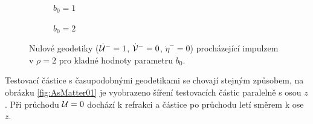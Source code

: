 \begin{figure}[ht]
    \centering
    \begin{subfigure}[b]{0.45\textwidth}
        \caption{$b_0 = 1$}
    \end{subfigure}
    \hfill
    \begin{subfigure}[b]{0.45\textwidth}
        \caption{$b_0 = 2$}
    \end{subfigure}
\caption{Nulové geodetiky ($\dot {\mathcal{U}}^-=1$, $\dot {\mathcal{V}}^-=0$, $\dot \eta^-=0$) procházející impulzem v $\rho=2$ pro kladné hodnoty parametru $b_0$.}
\label{fig:ASNullFyzikalnejsi}
\end{figure}

Testovací částice s časupodobnými geodetikami se chovají stejným způsobem, na obrázku \ref{fig:AsMatter01} je vyobrazeno
šíření testovacích částic paralelně s osou $z$. Při průchodu $\mathcal{U} = 0$ dochází k refrakci a částice po průchodu letí směrem k ose $z$.

